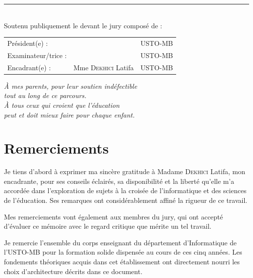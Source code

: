 \documentclass[12pt,a4paper,oneside]{report}
\begin{document}
\begin{titlepage}
\vfill
\rule{\linewidth}{0.5pt}\\[4pt]
{\small Soutenu publiquement le \underline{\hspace{3cm}} devant le jury composé de :}\\[8pt]
\begin{tabular}{lll}
Président(e) : & \underline{\hspace{5cm}} & USTO-MB \\[4pt]
Examinateur/trice : & \underline{\hspace{5cm}} & USTO-MB \\[4pt]
Encadrant(e) : & Mme \textsc{Dekhici} Latifa & USTO-MB \\
\end{tabular}
\end{titlepage}

\clearpage
\thispagestyle{empty}
\vspace*{4cm}
\begin{flushright}
\itshape
À mes parents, pour leur soutien indéfectible\\
tout au long de ce parcours.\\[12pt]
À tous ceux qui croient que l'éducation\\
peut et doit mieux faire pour chaque enfant.
\end{flushright}
\clearpage

\chapter*{Remerciements}
\thispagestyle{plain}

Je tiens d'abord à exprimer ma sincère gratitude à Madame \textsc{Dekhici} Latifa, mon encadrante, pour ses conseils éclairés, sa disponibilité et la liberté qu'elle m'a accordée dans l'exploration de sujets à la croisée de l'informatique et des sciences de l'éducation. Ses remarques ont considérablement affiné la rigueur de ce travail.

Mes remerciements vont également aux membres du jury, qui ont accepté d'évaluer ce mémoire avec le regard critique que mérite un tel travail.

Je remercie l'ensemble du corps enseignant du département d'Informatique de l'USTO-MB pour la formation solide dispensée au cours de ces cinq années. Les fondements théoriques acquis dans cet établissement ont directement nourri les choix d'architecture décrits dans ce document.
\end{document}
